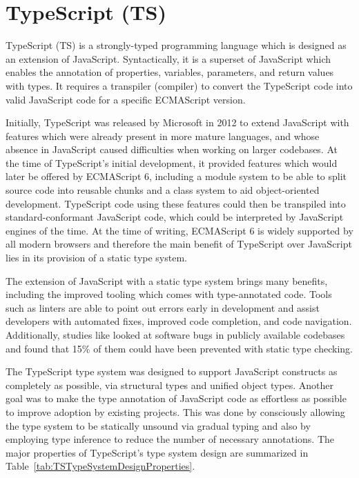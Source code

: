 \section{TypeScript (TS)}
\label{sec:TS}

TypeScript (TS) is a strongly-typed programming language which is
designed as an extension of JavaScript. Syntactically, it is a
superset of JavaScript which enables the annotation of properties,
variables, parameters, and return values with types. It requires a
transpiler (compiler) to convert the TypeScript code into valid
JavaScript code for a specific ECMAScript version.

Initially, TypeScript was released by Microsoft in 2012
\parencite{TSFirstRelease} to extend JavaScript with features which
were already present in more mature languages, and whose absence in
JavaScript caused difficulties when working on larger codebases. At
the time of TypeScript's initial development, it provided features
which would later be offered by ECMAScript 6, including a module
system to be able to split source code into reusable chunks and a
class system to aid object-oriented development. TypeScript code using
these features could then be transpiled into standard-conformant
JavaScript code, which could be interpreted by JavaScript engines of
the time. At the time of writing, ECMAScript 6 is widely supported by
all modern browsers and therefore the main benefit of TypeScript over
JavaScript lies in its provision of a static type system.

The extension of JavaScript with a static type system brings many
benefits, including the improved tooling which comes with
type-annotated code. Tools such as linters are able to point out
errors early in development and assist developers with automated
fixes, improved code completion, and code navigation.  Additionally,
studies like \textcite{ToTypeOrNotToType} looked at software bugs in
publicly available codebases and found that 15\% of them could have
been prevented with static type checking.



The TypeScript type system was designed to support JavaScript
constructs as completely as possible, via structural types and unified
object types. Another goal was to make the type annotation of
JavaScript code as effortless as possible to improve adoption by
existing projects. This was done by consciously allowing the type
system to be statically unsound via gradual typing and also by
employing type inference to reduce the number of necessary
annotations. The major properties of TypeScript's type system design
are summarized in Table~\ref{tab:TSTypeSystemDesignProperties}.


